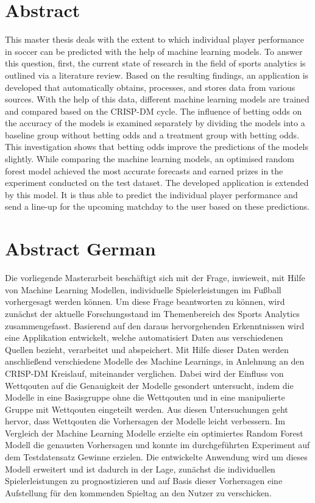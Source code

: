 \chapter*{Abstract}

This master thesis deals with the extent to which individual player performance in soccer can be predicted with the help of machine learning models. To answer this question, first, the current state of research in the field of sports analytics is outlined via a literature review. Based on the resulting findings, an application is developed that automatically obtains, processes, and stores data from various sources. With the help of this data, different machine learning models are trained and compared based on the CRISP-DM cycle. The influence of betting odds on the accuracy of the models is examined separately by dividing the models into a baseline group without betting odds and a treatment group with betting odds. This investigation shows that betting odds improve the predictions of the models slightly. While comparing the machine learning models, an optimised random forest model achieved the most accurate forecasts and earned prizes in the experiment conducted on the test dataset. The developed application is extended by this model. It is thus able to predict the individual player performance and send a line-up for the upcoming matchday to the user based on these predictions.

\clearpage \chapter*{Abstract German}

Die vorliegende Masterarbeit beschäftigt sich mit der Frage, inwieweit, mit Hilfe von Machine Learning Modellen, individuelle Spielerleistungen im Fußball vorhergesagt werden können. Um diese Frage beantworten zu können, wird zunächst der aktuelle Forschungsstand im Themenbereich des Sports Analytics zusammengefasst. Basierend auf den daraus hervorgehenden Erkenntnissen wird eine Applikation entwickelt, welche automatisiert Daten aus verschiedenen Quellen bezieht, verarbeitet und abspeichert. Mit Hilfe dieser Daten werden anschließend verschiedene Modelle des Machine Learnings, in Anlehnung an den CRISP-DM Kreislauf, miteinander verglichen. Dabei wird der Einfluss von Wettqouten auf die Genauigkeit der Modelle gesondert untersucht, indem die Modelle in eine Basisgruppe ohne die Wettqouten und in eine manipulierte Gruppe mit Wettqouten eingeteilt werden. Aus diesen Untersuchungen geht hervor, dass Wettqouten die Vorhersagen der Modelle leicht verbessern. Im Vergleich der Machine Learning Modelle erzielte ein optimiertes Random Forest Modell die genausten Vorhersagen und konnte im durchgeführten Experiment auf dem Testdatensatz Gewinne erzielen. Die entwickelte Anwendung wird um dieses Modell erweitert und ist dadurch in der Lage, zunächst die individuellen Spielerleistungen zu prognostizieren und auf Basis dieser Vorhersagen eine Aufstellung für den kommenden Spieltag an den Nutzer zu verschicken.


